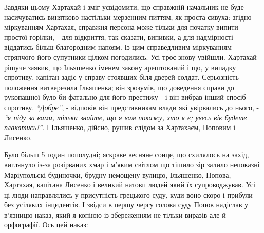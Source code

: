 \documentclass[a4paper,20pt]{report}
\begin{document}
Завдяки цьому Хартахай і зміг усвідомити, що справжній начальник не буде
насичуватись винятково настільки мерзенним питтям, як проста сивуха: згідно
міркуванням Хартахая, справжня персона може тільки для початку випити простої
горілки, - для відкриття, так сказати, випивки, а для надмірності віддатись
більш благородним напоям. Із цим справедливим міркуванням стряпчого його
супутники цілком погодились. Усі троє знову увійшли. Хартахай рішуче заявив, що
Ільяшенко іменем закону арештований і що, у випадку спротиву, капітан задіє у
справу стоявших біля дверей солдат.  Серьозність положення витверезила
Ільяшенка; він зрозумів, що доведення справи до рукопашної було би фатально для
його престижу - і він вибрав інший спосіб спротиву. \emph{``Добре''}, -
відповів він представникам влади які увірвались до нього, - \emph{``я піду за
вами, тільки знайте, що я вам покажу, хто я є; увесь вік будете плакатись!''}.
І Ільяшенко, дійсно, рушив слідом за Хартахаєм, Поповим і Лисенко.


Було більш 5 годин пополудні; яскраве весняне сонце, що схилялось на захід,
виглянуло із-за розірваних хмар і м'яким світлом що тішило зір залило непоказні
Маріупольскі будиночки, брудну немощену вулицю, Ільяшенко, Попова, Хартахая,
капітана Лисенко і великий натовп людей який їх супроводжував. Усі ці люди
направлялись у присутність грецького суду, куди воно скоро і прибули без усіляких інцидентів. І звідси 
в першу чергу голова суду Попов надіслав у в'язницю наказ, який я копіюю із збереженням не тільки 
виразів але й орфографії. Ось цей наказ:
\end{document}
